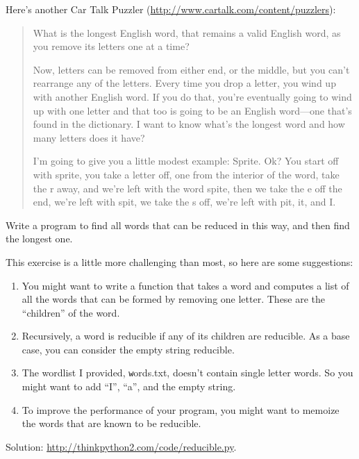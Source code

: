 \documentclass[
DIV=11,
fontsize=13,
twoside,
headinclude=false,
titlepage=firstiscover,
abstract=true,
headsepline=true,
footsepline=true,
chapterprefix=true, %
headings=big,
bibliography=totoc,%
captions=tableheading
]{scrbook}
\theoremstyle{definition}
\begin{document}
\begin{exercise}
\normalfont
{}

Here's another Car Talk Puzzler
(\url{http://www.cartalk.com/content/puzzlers}):

\begin{quote}
What is the longest English word, that remains a valid English word,
as you remove its letters one at a time?

Now, letters can be removed from either end, or the middle, but you
can't rearrange any of the letters. Every time you drop a letter, you
wind up with another English word. If you do that, you're eventually
going to wind up with one letter and that too is going to be an
English word---one that's found in the dictionary. I want to know
what's the longest word and how many letters does it
have?

I'm going to give you a little modest example: Sprite. Ok? You start
off with sprite, you take a letter off, one from the interior of the
word, take the r away, and we're left with the word spite, then we
take the e off the end, we're left with spit, we take the s off, we're
left with pit, it, and I.
\end{quote}

Write a program to find all words that can be reduced in this way,
and then find the longest one.

This exercise is a little more challenging than most, so here are
some suggestions:

\begin{enumerate}

\item You might want to write a function that takes a word and
  computes a list of all the words that can be formed by removing one
  letter.  These are the ``children'' of the word.

\item Recursively, a word is reducible if any of its children
are reducible.  As a base case, you can consider the empty
string reducible.

\item The wordlist I provided, {\texttt words.txt}, doesn't
contain single letter words.  So you might want to add
``I'', ``a'', and the empty string.

\item To improve the performance of your program, you might want
to memoize the words that are known to be reducible.

\end{enumerate}

Solution: \url{http://thinkpython2.com/code/reducible.py}.

\end{exercise}
\end{document}
